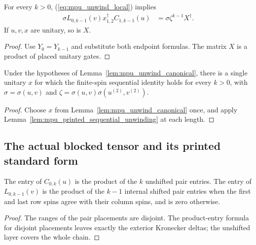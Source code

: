 \begin{lemma}
    \label{lem:mpu_printed_sequential_unwinding}
    \leanok
    For every $k>0$, (\ref{eq:mpu_unwind_local}) implies
    \begin{align*}
        \sigma L_{0,k-1}(v)x_{1,2}^\dagger C_{1,k-1}(u)
         & =\sigma\zeta^{k-1}X^\dagger.
    \end{align*}
    If $u,v,x$ are unitary, so is $X$.
\end{lemma}
\begin{proof}\leanok
    Use $Y_0=Y_{k-1}$ and substitute both endpoint formulas.
    The matrix $X$ is a product of placed unitary gates.
\end{proof}

\begin{lemma}
    \label{lem:mpu_canonical_printed_sequential_unwinding}
    \leanok
    Under the hypotheses of Lemma~\ref{lem:mpu_unwind_canonical}, there
    is a single unitary $x$ for which the finite-spin sequential identity
    holds for every $k>0$, with $\sigma=\sigma(u,v)$ and
    $\zeta=\sigma(u,v)\sigma(u^{(2)},v^{(2)})$.
\end{lemma}
\begin{proof}\leanok
    Choose $x$ from Lemma~\ref{lem:mpu_unwind_canonical} once, and apply
    Lemma~\ref{lem:mpu_printed_sequential_unwinding} at each length.
\end{proof}

\subsection{The actual blocked tensor and its printed standard form}

\begin{lemma}
    \label{lem:mpu_printed_open_layer_entries}
    \leanok
    The entry of $C_{0,k}(u)$ is the product of the $k$ unshifted pair
    entries. The entry of $L_{0,k-1}(v)$ is the product of the $k-1$
    internal shifted pair entries when the first and last row spins agree
    with their column spins, and is zero otherwise.
\end{lemma}
\begin{proof}\leanok
    The ranges of the pair placements are disjoint. The product-entry
    formula for disjoint placements leaves exactly the exterior
    Kronecker deltas; the unshifted layer covers the whole chain.
\end{proof}

